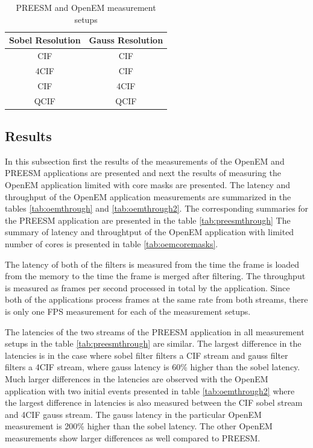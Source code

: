 \begin{table}
    \begin{center}
        \begin{tabular}{ c c }
            Sobel Resolution & Gauss Resolution \\ \hline
            CIF              & CIF              \\ \hline
            4CIF             & CIF              \\ \hline
            CIF              & 4CIF             \\ \hline
            QCIF             & QCIF             \\ \hline
        \end{tabular}
        \caption{PREESM and OpenEM measurement setups}
        \label{tab:preesm_setups}
    \end{center}
\end{table}

\subsection{Results}
In this subsection first the results of the measurements of the OpenEM and
PREESM applications are presented and next the results of measuring the OpenEM
application limited with core masks are presented. The latency and throughput of
the OpenEM application measurements are summarized in the tables
\ref{tab:oemthrough} and \ref{tab:oemthrough2}. The corresponding summaries for
the PREESM application are presented in the table \ref{tab:preesmthrough} The
summary of latency and throughtput of the OpenEM application with limited number
of cores is presented in table \ref{tab:oemcoremasks}.

The latency of both of the filters is measured from the time the frame is loaded
from the memory to the time the frame is merged after filtering. The throughput
is measured as frames per second processed in total by the application. Since
both of the applications process frames at the same rate from both streams,
there is only one FPS measurement for each of the measurement setups.

The latencies of the two streams of the PREESM application in all measurement
setups in the table \ref{tab:preesmthrough} are similar. The largest difference
in the latencies is in the case where sobel filter filters a CIF stream and
gauss filter filters a 4CIF stream, where gauss latency is 60\% higher than the
sobel latency. Much larger differences in the latencies are observed with the
OpenEM application with two initial events presented in table
\ref{tab:oemthrough2} where the largest difference in latencies is also measured
between the CIF sobel stream and 4CIF gauss stream. The gauss latency in the
particular OpenEM measurement is 200\% higher than the sobel latency. The other
OpenEM measurements show larger differences as well compared to PREESM.

